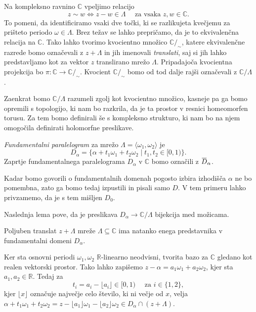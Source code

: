 \documentclass[mat1]{fmfdelo}
\newcommand{\R}{\mathbb R}
\newcommand{\C}{\mathbb C}
\newcommand{\om}{\omega}
\newcommand{\ols}[1]{\mskip.5\thinmuskip\overline{\mskip-.5\thinmuskip {#1} \mskip-.5\thinmuskip}\mskip.5\thinmuskip} %
\theoremstyle{definition}
\begin{document}
Na kompleksno ravnino $\C$ vpeljimo relacijo 
\[
    z \sim w \iff z - w \in \Lambda \quad \text{ za vsaka $z,w \in \C$.}
\]
To pomeni, da identificiramo vsaki dve točki, ki se razlikujeta kvečjemu za prišteto periodo $\omega \in \Lambda$. 
Brez težav se lahko prepričamo, da je to ekvivalenčna relacija na $\C$. Tako lahko tvorimo kvocientno množico $\C/_{\sim}$, katere ekvivalenčne razrede bomo označevali z $z + \Lambda$ in jih imenovali \emph{translati}, saj si jih lahko predstavljamo kot za vektor $z$ translirano mrežo $\Lambda$. Pripadajoča kvocientna projekcija bo $\pi : \C \to \C/_{\sim}$. Kvocient $\C/_{\sim}$ bomo od tod dalje rajši označevali z $\C/\Lambda$. 

Zaenkrat bomo $\C/\Lambda$ razumeli zgolj kot kvocientno množico, kasneje pa ga bomo opremili s topologijo, ki nam bo razkrila, da je ta prostor v resnici homeomorfen torusu. Za tem bomo definirali še s kompleksno strukturo, ki nam bo na njem omogočila definirati holomorfne preslikave.


\begin{definicija}
    \emph{Fundamentalni paralelogram} za mrežo $\Lambda = \langle \om_1, \om_2 \rangle$ je
    \[
        D_{\alpha} = \{\alpha + t_1 \om_1 + t_2 \om_2 \mid t_1, t_2 \in [0,1)\}.
    \]
    Zaprtje fundamentalnega paralelograma $D_\alpha$ v $\C$ bomo označili z $\ols{D}_\alpha$. 
\end{definicija}

\begin{opomba}
    Kadar bomo govorili o fundamentalnih domenah pogosto izbira izhodišča $\alpha$ ne bo pomembna, zato ga bomo tedaj izpustili in pisali samo $D$. V tem primeru lahko privzamemo, da je s tem mišljen $D_0$. 
\end{opomba}

Naslednja lema pove, da je preslikava $D_\alpha \to \C/\Lambda$ bijekcija med možicama. 

\begin{lema}
    \label{enolicni predstavnik}
    Poljuben translat $z + \Lambda$ mreže $\Lambda \subseteq \C$ ima natanko enega predstavnika v fundamentalni domeni $D_\alpha$. 
\end{lema}

\begin{dokaz}
    Ker sta osnovni periodi $\omega_1, \omega_2$ $\R$-linearno neodvisni, tvorita bazo za $\C$ gledano kot realen vektorski prostor. Tako lahko zapišemo $z - \alpha = a_1 \om_1 + a_2 \om_2$, kjer sta $a_1, a_2 \in \R$. Tedaj za 
    \[
        t_i = a_i - \lfloor a_i \rfloor \in [0,1) \quad \text{ za $i \in \{1,2\}$},
    \] 
    kjer $\lfloor x \rfloor$ označuje največje celo število, ki ni večje od $x$, velja $\alpha + t_1\om_1 + t_2 \om_2 = z - \lfloor a_1 \rfloor \om_1 - \lfloor a_2 \rfloor \om_2 \in D_\alpha \cap (z + \Lambda)$.
\end{dokaz}
\end{document}

